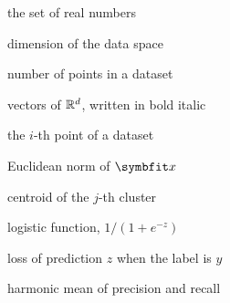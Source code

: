 \begin{listofsymbols}
  \item[$\R$]                 the set of real numbers
  \item[$d$]                  dimension of the data space
  \item[$n$]                  number of points in a dataset
  \item[$\bx, \by$]           vectors of $\mathbb{R}^d$, written in bold italic
  \item[$\bx_i$]              the $i$-th point of a dataset
  \item[$\lVert \bx \rVert$]  Euclidean norm of $\bx$
  \item[$\symbfit{\mu}_j$]    centroid of the $j$-th cluster
  \item[$\sigma(z)$]          logistic function, $1 / (1 + e^{-z})$
  \item[$\ell(y, z)$]         loss of prediction $z$ when the label is $y$
  \item[$\F_1$]               harmonic mean of precision and recall
\end{listofsymbols}
